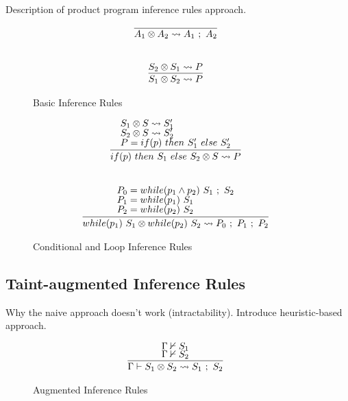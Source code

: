 \documentclass[letterpaper,twocolumn,10pt]{article}
\newcommand{\cross}{\otimes{}}
\begin{document}
Description of product program inference rules approach.

\begin{figure}
    \label{fig:infrules1}
    \caption{Basic Inference Rules}
    \[
		\begin{array}{c}
			\infer[]{A_1 \cross A_2 \leadsto A_1\ ;\ A_2}{} \\ \\ \\
			\infer[]{S_1 \cross S_2 \leadsto P}{
				S_2 \cross S_1 \leadsto P
			}
        \end{array}
    \]
\end{figure}

\begin{figure}
    \label{fig:infrules2}
    \caption{Conditional and Loop Inference Rules}
    \[
		\begin{array}{c}
			\infer[]{if(p)\ then\ S_1\ else\ S_2 \cross S \leadsto P}{
				\text{$S_1 \cross S \leadsto S_1'$} \\
				\text{$S_2 \cross S \leadsto S_2'$} \\
				\text{$P = if(p)\ then\ S_1'\ else\ S_2'$}
			} \\ \\ \\
			\infer[]{while(p_1)\ S_1 \cross while(p_2)\ S_2 \leadsto P_0\ ;\ P_1\ ;\ P_2}{
				\text{$P_0 = while(p_1 \land p_2)\ S_1\ ;\ S_2$} \\
				\text{$P_1 = while(p_1)\ S_1$} \\
				\text{$P_2 = while(p_2)\ S_2$}
			}
        \end{array}
    \]
\end{figure}

\subsection{Taint-augmented Inference Rules}

Why the naive approach doesn't work (intractability). Introduce heuristic-based approach.

\begin{figure}
    \label{fig:auginfrules1}
    \caption{Augmented Inference Rules}
    \[
		\begin{array}{c}
			\infer[]{\Gamma \vdash S_1 \cross S_2 \leadsto S_1\ ;\ S_2}{
				\Gamma \nvdash S_1 \\
				\Gamma \nvdash S_2
			} \\
		\end{array}
    \]
\end{figure}
\end{document}
